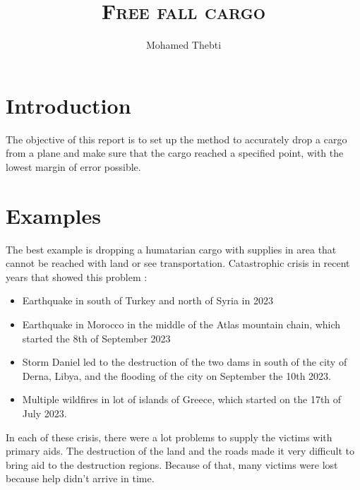 \documentclass[12pt,a4paper]{article}
\title{
	\Huge\textsc{Free fall cargo}
}
\author{Mohamed Thebti}
\begin{document}
\setlength{\parindent}{0mm}

\fancyhead[R]{\slshape \leftmark}

\fancyfoot[C]{}
\fancyfoot[R]{\thepage}

\maketitle
\newpage

\tableofcontents

\newpage



\section{Introduction}

The objective of this report is to set up the method to accurately drop a cargo from a plane and make sure that the cargo reached a specified point, with the lowest margin of error possible. 


\section{Examples}

The best example is dropping a humatarian cargo with supplies in area that cannot be reached with land or see transportation.
Catastrophic crisis in recent years that showed this problem : 
\begin{itemize}
	\item Earthquake in south of Turkey and north of Syria in 2023
	\item Earthquake in Morocco in the middle of the Atlas mountain chain, which started the 8th of September 2023
	\item Storm Daniel led to the destruction of the two dams in south of the city of Derna, Libya, and the flooding of the city on September the 10th 2023.
	\item Multiple wildfires in lot of islands of Greece, which started on the 17th of July 2023.
\end{itemize}

In each of these crisis, there were a lot problems to supply the victims with primary aids. The destruction of the land and the roads made it very difficult to bring aid to the destruction regions. Because of that, many victims were lost because help didn't arrive in time. 
\end{document}
